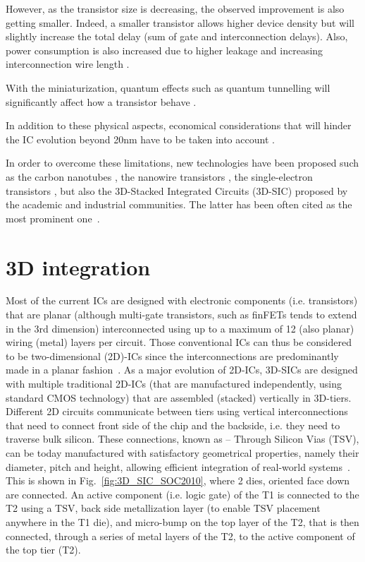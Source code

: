 However, as the transistor size is decreasing, the observed improvement is also getting smaller. Indeed, a smaller transistor allows higher device density but will slightly increase the total delay (sum of gate and interconnection delays). Also, power consumption is also increased due to higher leakage and increasing interconnection wire length \cite{5227192}.

With the miniaturization, quantum effects such as quantum tunnelling will significantly affect how a transistor behave \cite{1240081}.

In addition to these physical aspects, economical considerations that will hinder the IC evolution beyond 20nm have to be taken into account \cite{5227192,PFF10}.

In order to overcome these limitations, new technologies have been proposed such as the carbon nanotubes \cite{tans1998room}, the nanowire transistors \cite{doi:10.1021/nl025875l}, the single-electron transistors \cite{citeulike:4194929}, but also the 3D-Stacked Integrated Circuits (3D-SIC) proposed by the academic and industrial communities. The latter has been often cited as the most prominent one~\cite{659500}.

\section{3D integration}

Most of the current ICs are designed with electronic components (i.e. transistors) that are planar (although multi-gate transistors, such as finFETs tends to extend in the 3rd dimension) interconnected using up to a maximum of 12 (also planar) wiring (metal) layers per circuit. Those conventional ICs can thus be considered to be two-dimensional (2D)-ICs since the interconnections are predominantly made in a planar fashion~\cite{1393404,fujitsu08}. As a major evolution of 2D-ICs, 3D-SICs are designed with multiple traditional 2D-ICs (that are manufactured independently, using standard CMOS technology) that are assembled (stacked) vertically in 3D-tiers. Different 2D circuits communicate between tiers using vertical interconnections that need to connect front side of the chip and the backside, i.e. they need to traverse bulk silicon. These connections, known as \--- Through Silicon Vias (TSV), can be today manufactured with satisfactory geometrical properties, namely their diameter, pitch and height, allowing efficient integration of real-world systems~\cite{1705326,5746413}. This is shown in Fig.~\ref{fig:3D_SIC_SOC2010}, where 2 dies, oriented face down are connected. An active component (i.e. logic gate) of the T1 is connected to the T2 using a TSV, back side metallization layer (to enable TSV placement anywhere in the T1 die), and micro-bump on the top layer of the T2, that is then connected, through a series of metal layers of the T2, to the active component of the top tier (T2).

